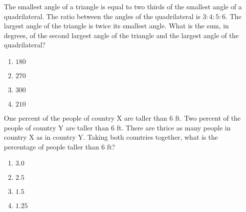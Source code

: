 \item{
The smallest angle of a triangle is equal to two thirds of the smallest angle of a quadrilateral. The ratio between the angles of the quadrilateral is $3:4:5:6$. The largest angle of the triangle is twice its smallest angle. What is the sum, in degrees, of the second largest angle of the triangle and the largest angle of the quadrilateral? 
\begin{multicols}{4}
\begin{enumerate}
\item $180$
\item $270$
\item $300$
\item $210$
\end{enumerate}
\end{multicols}
}
\item{
One percent of the people of country X are taller than $6$ ft. Two percent of the people of country Y are taller than $6$ ft. There are thrice as many people in country X as in country Y. Taking both countries together, what is the percentage of people taller than $6$ ft?
\begin{multicols}{4}
\begin{enumerate}
\item $3.0$
\item $2.5$
\item $1.5$
\item $1.25$
\end{enumerate}
\end{multicols}
}
